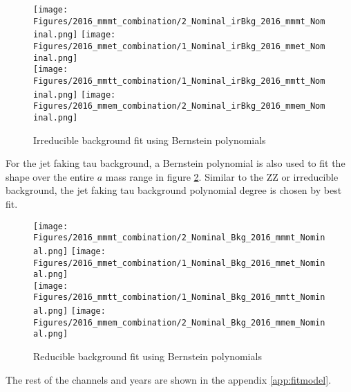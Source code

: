 \begin{figure}[ht!b]
  \centering
  \texttt{[image: Figures/2016\_mmmt\_combination/2\_Nominal\_irBkg\_2016\_mmmt\_Nominal.png]}
  \texttt{[image: Figures/2016\_mmet\_combination/1\_Nominal\_irBkg\_2016\_mmet\_Nominal.png]}\\
  \texttt{[image: Figures/2016\_mmtt\_combination/1\_Nominal\_irBkg\_2016\_mmtt\_Nominal.png]}
  \texttt{[image: Figures/2016\_mmem\_combination/2\_Nominal\_irBkg\_2016\_mmem\_Nominal.png]}\\
    \caption{\label{fig:fit_ZZ} Irreducible background fit using Bernstein polynomials}
\end{figure}

For the jet faking tau background, a Bernstein polynomial is also used to fit the shape over the entire $a$ mass range in figure \ref{fig:fit_FF}. Similar to the ZZ or irreducible background, the jet faking tau background polynomial degree is chosen by best fit. 



\begin{figure}[ht!b]
  \centering
  \texttt{[image: Figures/2016\_mmmt\_combination/2\_Nominal\_Bkg\_2016\_mmmt\_Nominal.png]}
  \texttt{[image: Figures/2016\_mmet\_combination/1\_Nominal\_Bkg\_2016\_mmet\_Nominal.png]}\\
  \texttt{[image: Figures/2016\_mmtt\_combination/1\_Nominal\_Bkg\_2016\_mmtt\_Nominal.png]}
  \texttt{[image: Figures/2016\_mmem\_combination/2\_Nominal\_Bkg\_2016\_mmem\_Nominal.png]}\\
    \caption{\label{fig:fit_FF} Reducible background fit using Bernstein polynomials}
\end{figure}

The rest of the channels and years are shown in the appendix \ref{app:fitmodel}. 

